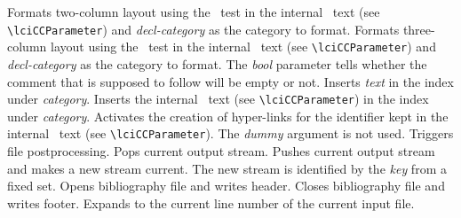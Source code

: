 \documentclass[11pt]{article}
\begin{document}
\begin{description}
    Formats two-column layout using the \CC\ test in the internal \CC\ text
    (see \verb+\lciCCParameter+) and {\em decl-category} as the category 
    to format.
    Formats three-column layout using the \CC\ test in the internal \CC\ text
    (see \verb+\lciCCParameter+) and {\em decl-category} as the category 
    to format. The {\em bool\/} parameter tells whether the comment that 
    is supposed to follow will be empty or not.
    Inserts {\em text\/} in the index under {\em category}.
    Inserts the internal \CC\ text (see \verb+\lciCCParameter+) in the 
    index under {\em category}.
    Activates the creation of hyper-links for the identifier kept in the 
    internal \CC\ text (see \verb+\lciCCParameter+). The {\em dummy\/}
    argument is not used.
    Triggers file postprocessing.
    Pops current output stream.
    Pushes current output stream and makes a new stream current.
    The new stream is identified by the {\em key\/} from a fixed set.
    Opens bibliography file and writes header.
    Closes bibliography file and writes footer.
    Expands to the current line number of the current input file.
\end{description}





\newpage

%


\small
\printindex
\end{document}
